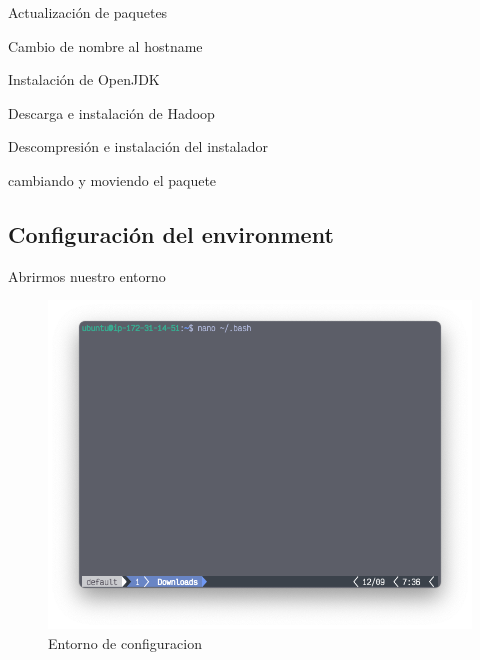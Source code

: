 Actualización de paquetes


Cambio de nombre al hostname

Instalación de OpenJDK


Descarga e instalación de Hadoop


Descompresión e instalación del instalador

cambiando y moviendo el paquete

\subsection{Configuración del environment}
Abrirmos nuestro entorno
\clearpage

 \begin{figure}[h]
	\centering
	\includegraphics[scale=.35] {img/22-editBashRc}
	\caption{Entorno de configuracion}
	\label{fig:22}	
\end{figure}


